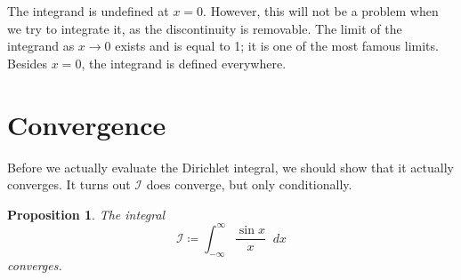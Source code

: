 \documentclass[a4paper]{article}
\newcommand*\diff{\mathop{}\!d} %
\newtheorem{proposition}[theorem]{Proposition}
\theoremstyle{definition}
\begin{document}
The integrand is undefined at $x=0$.
However, this will not be a problem when we try to integrate it, as the discontinuity is removable.
The limit of the integrand as $x \to 0$ exists and is equal to 1; it is one of the most famous limits.
Besides $x=0$, the integrand is defined everywhere.

\section{Convergence}

Before we actually evaluate the Dirichlet integral, we should show that it actually converges.
It turns out $\mathcal{I}$ does converge, but only conditionally.
\begin{proposition} \label{thm:convergence proposition 1}
    The integral
    \begin{equation*}
        \mathcal{I} \coloneq \int_{-\infty}^{\infty} \frac{\sin x}{x} \diff x
    \end{equation*}
    converges.
\end{proposition}
\end{document}

